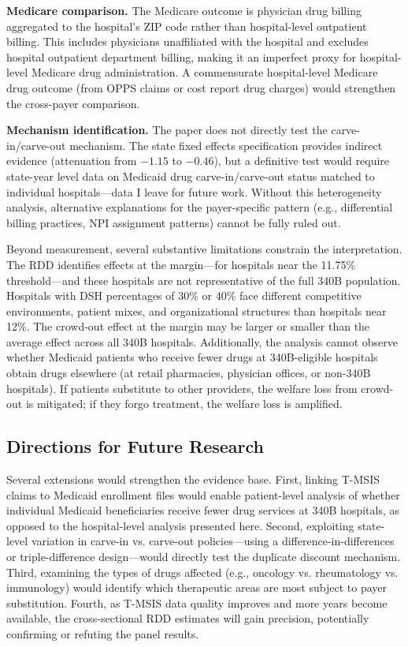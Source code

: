 \documentclass[12pt]{article}
\begin{document}
\textbf{Medicare comparison.} The Medicare outcome is physician drug billing aggregated to the hospital's ZIP code rather than hospital-level outpatient billing. This includes physicians unaffiliated with the hospital and excludes hospital outpatient department billing, making it an imperfect proxy for hospital-level Medicare drug administration. A commensurate hospital-level Medicare drug outcome (from OPPS claims or cost report drug charges) would strengthen the cross-payer comparison.

\textbf{Mechanism identification.} The paper does not directly test the carve-in/carve-out mechanism. The state fixed effects specification provides indirect evidence (attenuation from $-1.15$ to $-0.46$), but a definitive test would require state-year level data on Medicaid drug carve-in/carve-out status matched to individual hospitals---data I leave for future work. Without this heterogeneity analysis, alternative explanations for the payer-specific pattern (e.g., differential billing practices, NPI assignment patterns) cannot be fully ruled out.

Beyond measurement, several substantive limitations constrain the interpretation. The RDD identifies effects at the margin---for hospitals near the 11.75\% threshold---and these hospitals are not representative of the full 340B population. Hospitals with DSH percentages of 30\% or 40\% face different competitive environments, patient mixes, and organizational structures than hospitals near 12\%. The crowd-out effect at the margin may be larger or smaller than the average effect across all 340B hospitals. Additionally, the analysis cannot observe whether Medicaid patients who receive fewer drugs at 340B-eligible hospitals obtain drugs elsewhere (at retail pharmacies, physician offices, or non-340B hospitals). If patients substitute to other providers, the welfare loss from crowd-out is mitigated; if they forgo treatment, the welfare loss is amplified.

\subsection{Directions for Future Research}

Several extensions would strengthen the evidence base. First, linking T-MSIS claims to Medicaid enrollment files would enable patient-level analysis of whether individual Medicaid beneficiaries receive fewer drug services at 340B hospitals, as opposed to the hospital-level analysis presented here. Second, exploiting state-level variation in carve-in vs. carve-out policies---using a difference-in-differences or triple-difference design---would directly test the duplicate discount mechanism. Third, examining the types of drugs affected (e.g., oncology vs. rheumatology vs. immunology) would identify which therapeutic areas are most subject to payer substitution. Fourth, as T-MSIS data quality improves and more years become available, the cross-sectional RDD estimates will gain precision, potentially confirming or refuting the panel results.
\end{document}

